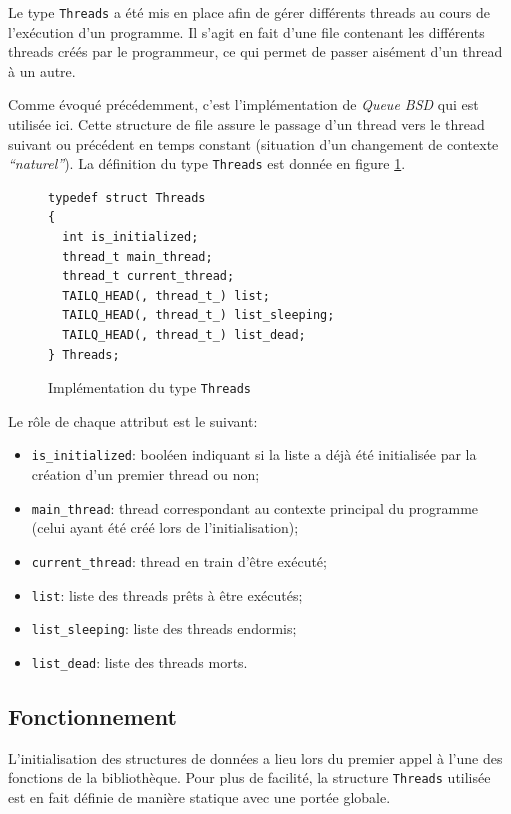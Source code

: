 \documentclass[a4paper,11pt]{article}
\begin{document}
Le type \texttt{Threads} a été mis en place afin de gérer différents threads au cours de l'exécution d'un programme. Il s'agit en fait d'une file contenant les différents threads créés par le programmeur, ce qui permet de passer aisément d'un thread à un autre.

Comme évoqué précédemment, c'est l'implémentation de \textit{Queue BSD} qui est utilisée ici. Cette structure de file assure le passage d'un thread vers le thread suivant ou précédent en temps constant (situation d'un changement de contexte \textit{``naturel''}). La définition du type \texttt{Threads} est donnée en figure \ref{threadst}.

\begin{figure}[H]
\begin{lstlisting}
typedef struct Threads
{
  int is_initialized;
  thread_t main_thread;
  thread_t current_thread;
  TAILQ_HEAD(, thread_t_) list;
  TAILQ_HEAD(, thread_t_) list_sleeping;
  TAILQ_HEAD(, thread_t_) list_dead;
} Threads;
\end{lstlisting}
\caption{Implémentation du type \texttt{Threads}}
\label{threadst}
\end{figure}

Le rôle de chaque attribut est le suivant:
\begin{itemize}
  \item \texttt{is\_initialized}: booléen indiquant si la liste a déjà été initialisée par la création d'un premier thread ou non;
  \item \texttt{main\_thread}: thread correspondant au contexte principal du programme (celui ayant été créé lors de l'initialisation);
  \item \texttt{current\_thread}: thread en train d'être exécuté;
  \item \texttt{list}: liste des threads prêts à être exécutés;
  \item \texttt{list\_sleeping}: liste des threads endormis;
  \item \texttt{list\_dead}: liste des threads morts.
\end{itemize}

\subsection{Fonctionnement}

L'initialisation des structures de données a lieu lors du premier appel à l'une des fonctions de la bibliothèque. Pour plus de facilité, la structure \texttt{Threads} utilisée est en fait définie de manière statique avec une portée globale.
\end{document}
